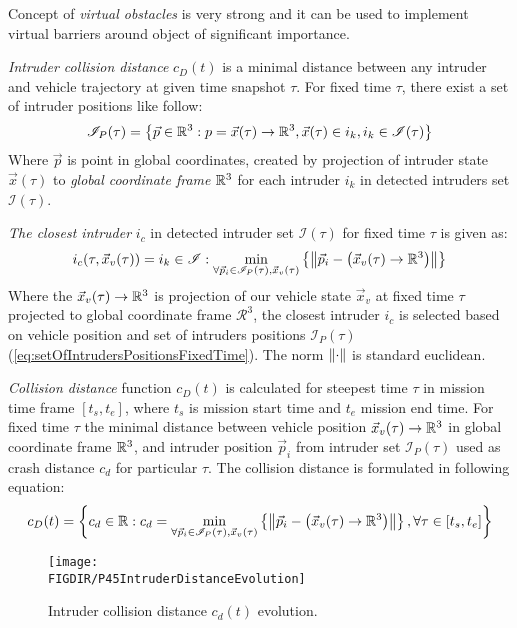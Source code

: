Concept of \emph{virtual obstacles} is very strong and it can be used to implement virtual barriers around object of significant importance.

\emph{Intruder collision distance} $c_D(t)$ is a minimal distance between any intruder and vehicle trajectory at given time snapshot $\tau$. For fixed time $\tau$, there exist a set of intruder positions like follow:
\begin{equation}\label{eq:setOfIntrudersPositionsFixedTime}
    \mathscr{I}_P(\tau)=\left\{\vec{p}\in\mathbb{R}^3:p=\vec{x}(\tau)\to\mathbb{R}^3,\vec{x}(\tau)\in i_k, i_k\in \mathscr{I}(\tau)\right\}
\end{equation}
Where $\vec{p}$ is point in global coordinates, created by projection of intruder state $\vec{x}(\tau)$ to \emph{global coordinate frame} $\mathbb{R}^3$ for each intruder $i_k$ in detected intruders set $\mathscr{I}(\tau)$.

\emph{The closest intruder} $i_c$ in detected intruder set $\mathscr{I}(\tau)$ for fixed time $\tau$ is given as:
\begin{equation}
    i_c(\tau,\vec{x}_v(\tau))=i_k\in\mathscr{I}:\min_{\forall \vec{p}_i\in\mathscr{I}_P(\tau), \vec{x}_v(\tau)}\left\{\left\lVert\vec{p}_i-\left( \vec{x}_v(\tau)\to\mathbb{R}^3\right)\right\rVert\right\}
\end{equation}
Where the $\vec{x}_v(\tau)\to\mathbb{R}^3$ is projection of our vehicle state $\vec{x}_v$ at fixed time $\tau$ projected to global coordinate frame $\mathscr{R}^3$, the closest intruder $i_c$ is selected based on vehicle position and set of intruders positions $\mathscr{I}_P(\tau)$ (\ref{eq:setOfIntrudersPositionsFixedTime}). The norm $\left\lVert\cdot\right\rVert$ is standard euclidean. 

\emph{Collision distance} function $c_D(t)$ is calculated for steepest time $\tau$ in mission time frame $[t_s,t_e]$, where $t_s$ is mission start time and $t_e$ mission end time. For fixed time $\tau$ the minimal distance between vehicle position $\vec{x}_v(\tau)\to\mathbb{R}^3$ in global coordinate frame $\mathbb{R}^3$, and intruder position $\vec{p}_i$ from intruder set $\mathscr{I}_P(\tau)$ used as crash distance $c_d$ for particular $\tau$. The collision distance is formulated in following equation:
\begin{equation}
    c_D(t)=\left\{c_d\in\mathbb{R}: c_d=\min_{\forall \vec{p}_i\in\mathscr{I}_P(\tau), \vec{x}_v(\tau)}\left\{\left\lVert\vec{p}_i-\left( \vec{x}_v(\tau)\to\mathbb{R}^3\right)\right\rVert\right\}, \forall \tau \in [t_s,t_e]\right\}
\end{equation}

\begin{figure}[H]
    \centering
    \texttt{[image: \\FIGDIR/P45IntruderDistanceEvolution]}
    \caption{Intruder collision distance $c_d(t)$ evolution.}
    \label{fig:P45IntruderDistanceEvolution}
\end{figure}

